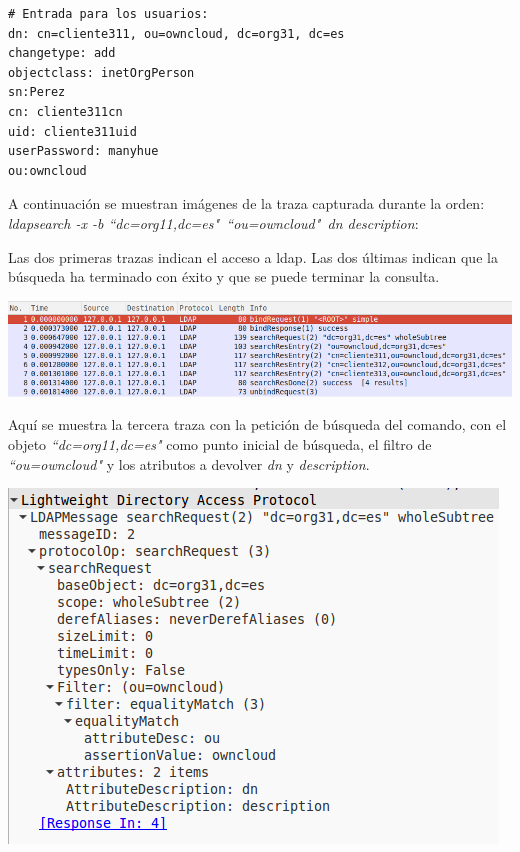 \documentclass[]{article}
\begin{document}
\begin{BVerbatim}
# Entrada para los usuarios:
dn: cn=cliente311, ou=owncloud, dc=org31, dc=es
changetype: add
objectclass: inetOrgPerson
sn:Perez
cn: cliente311cn
uid: cliente311uid
userPassword: manyhue
ou:owncloud
\end{BVerbatim}


A continuación se muestran imágenes de la traza capturada durante la orden: \textit{ldapsearch -x -b “dc=org11,dc=es"\ “ou=owncloud"\ dn description}:

Las dos primeras trazas indican el acceso a ldap. Las dos últimas indican que la búsqueda ha terminado con éxito y que se puede terminar la consulta.

\begin{center}
\includegraphics[scale=0.5]{images/ldap/ldap1}
\end{center}

Aquí se muestra la tercera traza con la petición de búsqueda del comando, con el objeto \textit{“dc=org11,dc=es"} como punto inicial de búsqueda, el filtro de \textit{“ou=owncloud"} y los atributos a devolver \textit{dn} y \textit{description}.

\begin{center}
	\includegraphics[scale=0.5]{images/ldap/ldap2}
\end{center}
\end{document}
